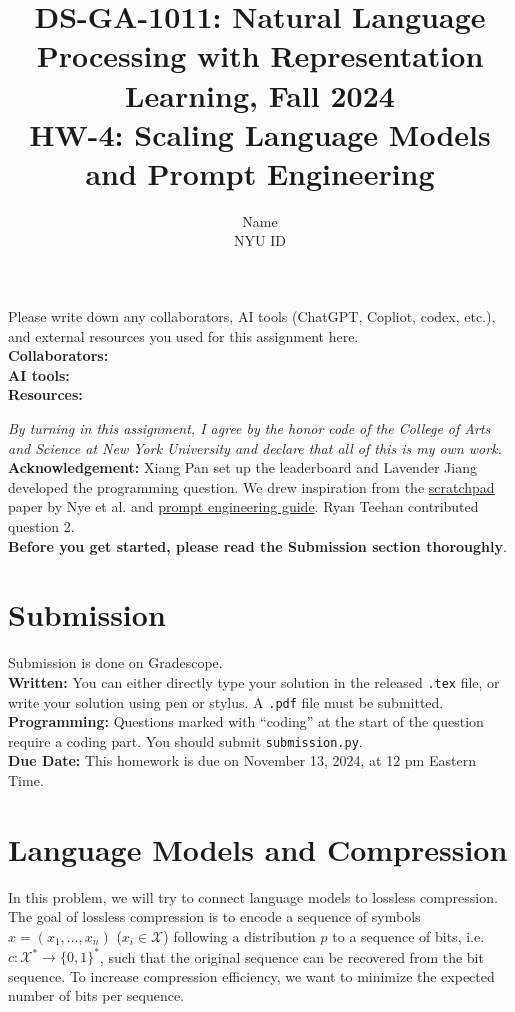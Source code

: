 \documentclass{article}
\title{\textbf{DS-GA-1011: Natural Language Processing with Representation Learning, Fall 2024} \\HW-4: Scaling Language Models and Prompt Engineering}
\author{Name \\
NYU ID}
\date{}
\theoremstyle{case}
\theoremstyle{definition}
\begin{document}
\maketitle

\begin{tcolorbox}
Please write down any collaborators, AI tools (ChatGPT, Copliot, codex, etc.), and external resources you used for this assignment here. \\
\textbf{Collaborators:} \\
\textbf{AI tools:} \\
\textbf{Resources:}
\end{tcolorbox}
\textit{By turning in this assignment, I agree by the honor code of the College of Arts and Science at New York University and declare
that all of this is my own work.} \\

\textbf{Acknowledgement:} Xiang Pan set up the leaderboard and Lavender Jiang developed the programming question. We drew inspiration from the \href{https://arxiv.org/abs/2112.00114}{scratchpad} paper by Nye et al. and \href{https://www.promptingguide.ai/}{prompt engineering guide}. Ryan Teehan contributed question 2.\\


\textbf{Before you get started, please read the Submission section thoroughly}.

\section*{Submission}
Submission is done on Gradescope. \\

\textbf{Written:} You can either directly type your solution in the released \texttt{.tex} file,
or write your solution using pen or stylus.
A \texttt{.pdf} file must be submitted.\\

\textbf{Programming:} Questions marked with ``coding'' at the start of the question require a coding part. You should submit \texttt{submission.py}.\\

\textbf{Due Date:} This homework is due on November 13, 2024, at 12 pm Eastern Time.

\section{Language Models and Compression}

In this problem, we will try to connect language models to lossless compression.
The goal of lossless compression is to encode a sequence of symbols $x=(x_1,\ldots, x_n)$ ($x_i\in\mathcal{X}$) following a distribution $p$ to a sequence of bits, i.e.\ $c: \mathcal{X}^* \to \{0,1\}^*$,
such that the original sequence can be recovered from the bit sequence.
To increase compression efficiency, we want to minimize the expected number of bits per sequence.
\end{document}
